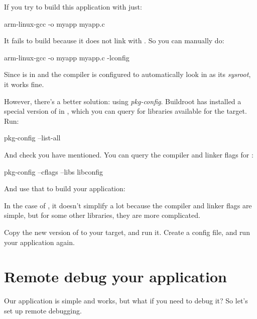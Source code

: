 If you try to build this application with just:

\begin{bashinput}
arm-linux-gcc -o myapp myapp.c
\end{bashinput}

It fails to build because it does not link with . So
you can manually do:

\begin{bashinput}
arm-linux-gcc -o myapp myapp.c -lconfig
\end{bashinput}

Since  is in  and the
compiler is configured to automatically look in 
as its {\em sysroot}, it works fine.

However, there's a better solution: using {\em pkg-config}. Buildroot
has installed a special version of  in
, which you can query for libraries
available for the target. Run:

\begin{bashinput}
pkg-config --list-all
\end{bashinput}

And check you have  mentioned. You can query the
compiler and linker flags for :

\begin{bashinput}
pkg-config --cflags --libs libconfig
\end{bashinput}

And use that to build your application:


In the case of , it doesn't simplify a lot because the
compiler and linker flags are simple, but for some other libraries,
they are more complicated.

Copy the new version of  to your target, and run
it. Create a  config file, and run your application
again.

\section{Remote debug your application}

Our application is simple and works, but what if you need to debug it?
So let's set up remote debugging.

